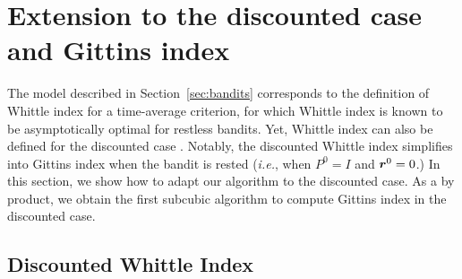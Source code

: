 \documentclass[acmsmall,screen,anonymous]{acmart}
\begin{document}
\section{Extension to the discounted case and Gittins index}
\label{sec:discounted}

The model described in Section~\ref{sec:bandits} corresponds to the definition of Whittle index for a time-average criterion, for which Whittle index is known to be asymptotically optimal \cite{weber1990index} for restless bandits. Yet, Whittle index can also be defined for the discounted case \cite{nino2020fast, akbarzadeh2020conditions}. Notably, the discounted Whittle index simplifies into Gittins index when the bandit is rested (\emph{i.e.}, when $P^0=I$ and $\boldsymbol{r}^0=0$.) In this section, we show how to adapt our algorithm to the discounted case. As a by product, we obtain the first subcubic algorithm to compute Gittins index in the discounted case.

\subsection{Discounted Whittle Index}
\end{document}
